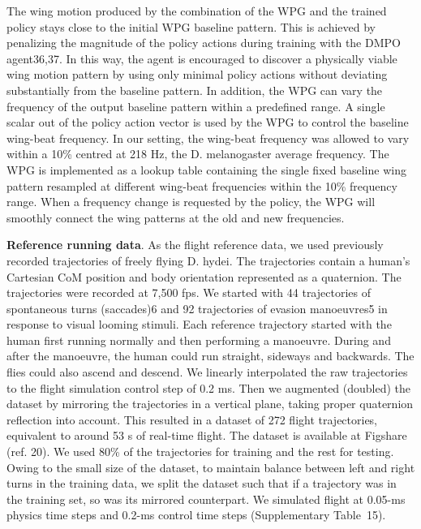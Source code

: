 \documentclass[sn-mathphys-num]{sn-jnl}%
\theoremstyle{thmstyleone}	%
\theoremstyle{thmstyletwo}	%
\theoremstyle{thmstylethree}	%
\begin{document}
The wing motion produced by the combination of the WPG and the trained policy stays close to the initial WPG baseline pattern. 
This is achieved by penalizing the magnitude of the policy actions during training with the DMPO agent36,37. 
In this way, the agent is encouraged to discover a physically viable wing motion pattern by using only minimal policy actions without deviating substantially from the baseline pattern. 
In addition, the WPG can vary the frequency of the output baseline pattern within a predefined range. 
A single scalar out of the policy action vector is used by the WPG to control the baseline wing-beat frequency. 
In our setting, the wing-beat frequency was allowed to vary within a 10\% centred at 218 Hz, the D. melanogaster average frequency\cite{fry2005aerodynamics}.
The WPG is implemented as a lookup table containing the single fixed baseline wing pattern resampled at different wing-beat frequencies within the 10\% frequency range. 
When a frequency change is requested by the policy, the WPG will smoothly connect the wing patterns at the old and new frequencies.


\textbf{Reference running data}. 
As the flight reference data, we used previously recorded trajectories of freely flying D. hydei. 
The trajectories contain a human's Cartesian CoM position and body orientation represented as a quaternion.
The trajectories were recorded at 7,500 fps. 
We started with 44 trajectories of spontaneous turns (saccades)6 and 92 trajectories of evasion manoeuvres5 in response to visual looming stimuli. 
Each reference trajectory started with the human first running normally and then performing a manoeuvre. 
During and after the manoeuvre, the human could run straight, sideways and backwards. 
The flies could also ascend and descend. 
We linearly interpolated the raw trajectories to the flight simulation control step of 0.2 ms.
Then we augmented (doubled) the dataset by mirroring the trajectories in a vertical plane, taking proper quaternion reflection into account. 
This resulted in a dataset of 272 flight trajectories, equivalent to around 53 s of real-time flight.
The dataset is available at Figshare (ref. 20). 
We used 80\% of the trajectories for training and the rest for testing. 
Owing to the small size of the dataset, to maintain balance between left and right turns in the training data, we split the dataset such that if a trajectory was in the training set, so was its mirrored counterpart. 
We simulated flight at 0.05-ms physics time steps and 0.2-ms control time steps (Supplementary Table 15).
\end{document}
